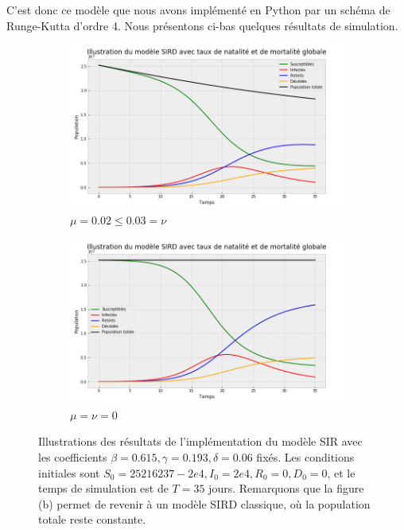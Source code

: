 \documentclass[
  french,
	10pt, %
]{fphw}
\begin{document}
C'est donc ce modèle que nous avons implémenté en Python par un schéma de Runge-Kutta d'ordre 4. Nous présentons ci-bas quelques résultats de simulation.
\begin{figure}[H]
	\centering
	\begin{subfigure}{0.48\textwidth}
		\centering
		\includegraphics[width=\textwidth]{Simu1.png}
	  \caption{$\mu = 0.02 \leq 0.03 = \nu$}
  \label{fig:simu1}
	\end{subfigure}
	\begin{subfigure}{0.48\textwidth}
		\centering
		\includegraphics[width=\textwidth]{Simu2.png}
	  \caption{$\mu = \nu = 0$}
  \label{fig:simu2}
	\end{subfigure}
	\caption{Illustrations des résultats de l'implémentation du modèle SIR avec les coefficients $\beta = 0.615, \gamma=0.193, \delta = 0.06$ fixés. Les conditions initiales sont $S_0 = 25216237-2e4, I_0=2e4, R_0=0, D_0=0$, et le temps de simulation est de $T=35$ jours. Remarquons que la figure (b) permet de revenir à un modèle SIRD classique, où la population totale reste constante.}
	\label{fig:simu}
\end{figure}
\end{document}

